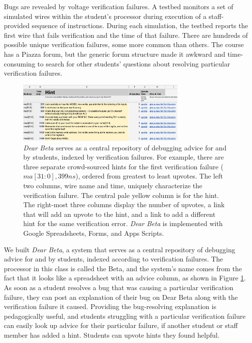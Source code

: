 \documentclass{sigchi}
\begin{document}
Bugs are revealed by voltage verification failures. A testbed monitors a set of simulated wires within the student's processor during execution of a staff-provided sequence of instructions. During each simulation, the testbed reports the first wire that fails verification and the time of that failure. There are hundreds of possible unique verification failures, some more common than others. The course has a Piazza forum, but the generic forum structure made it awkward and time-consuming to search for other students' questions about resolving particular verification failures.  %

\begin{figure}
\centering
\includegraphics[width=0.75\textwidth]{DearBeta.jpg}
\caption{{\it Dear Beta} serves as a central repository of debugging advice for and by students, indexed by verification failures. For example, there are three separate crowd-sourced hints for the first verification failure ($ma[31:0], 399ns$), ordered from greatest to least upvotes. The left two columns, wire name and time, uniquely characterize the verification failure. The central pale yellow column is for the hint. The right-most three columns display the number of upvotes, a link that will add an upvote to the hint, and a link to add a different hint for the same verification error. {\it Dear Beta} is implemented with Google Spreadsheets, Forms, and Apps Scripts.}
\label{fig:figure3}
\end{figure}

We built {\it Dear Beta}, a system that serves as a central repository of debugging advice for and by students, indexed according to verification failures. The processor in this class is called the Beta, and the system's name comes from the fact that it looks like a spreadsheet with an advice column, as shown in Figure \ref{fig:figure3}. As soon as a student resolves a bug that was causing a particular verification failure, they can post an explanation of their bug on Dear Beta along with the verification failure it caused. Providing the bug-resolving explanation is pedagogically useful, and students struggling with a particular verification failure can easily look up advice for their particular failure, if another student or staff member has added a hint. Students can upvote hints they found helpful. 
\end{document}
